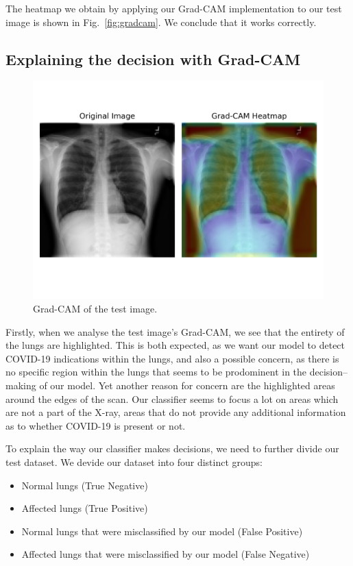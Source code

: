 \documentclass[conference]{IEEEtran}
\begin{document}
The heatmap we obtain by applying our Grad-CAM implementation to our test image is shown in Fig.~\ref{fig:gradcam}. We conclude that it works correctly.

\subsection{Explaining the decision with Grad-CAM}

\begin{figure}[htbp]
	\centerline{\includegraphics[width=\linewidth]{Images/gradcam_test_image.png}}
	\caption{Grad-CAM of the test image.}
	\label{fig:gradcam_test_image}
\end{figure}

Firstly, when we analyse the test image's Grad-CAM, we see that the entirety of the lungs are highlighted. This is both expected, as we want our model to detect COVID-19 indications within the lungs, and also a possible concern, as there is no specific region within the lungs that seems to be prodominent in the decision–making of our model. Yet another reason for concern are the highlighted areas around the edges of the scan. Our classifier seems to focus a lot on areas which are not a part of the X-ray, areas that do not provide any additional information as to whether COVID-19 is present or not.

To explain the way our classifier makes decisions, we need to further divide our test dataset. We devide our dataset into four distinct groups:

\begin{itemize}
	\item Normal lungs (True Negative)
	\item Affected lungs (True Positive)
	\item Normal lungs that were misclassified by our model (False Positive)
	\item Affected lungs that were misclassified by our model (False Negative)
\end{itemize}
\end{document}
